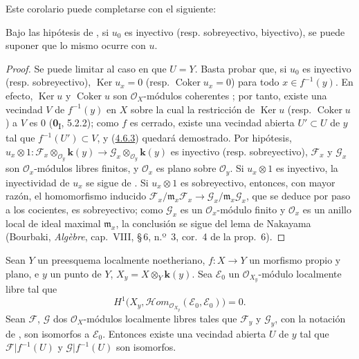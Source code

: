 Este corolario puede completarse con el siguiente:

\begin{corollary}[4.6.3]
\label{III.4.6.3}
\label{III.4.6.3-fr}
Bajo las hipótesis de , si $u_0$ es inyectivo \textup{(resp.} sobreyectivo, biyectivo), se puede suponer que lo mismo ocurre con $u$.
\end{corollary}

\begin{proof}
Se puede limitar al caso en que $U=Y$. Basta probar
que, si $u_0$ es
inyectivo (resp. sobreyectivo), $\operatorname{Ker}u_x=0$ (resp.
$\operatorname{Coker}u_x=0$) para todo $x\in f^{-1}(y)$. En efecto, $\operatorname{Ker}u$ y $\operatorname{Coker}u$ son
$\mathcal O_X$-módulos coherentes ; por tanto, existe una
vecindad $V$ de $f^{-1}(y)$ en $X$ sobre la cual la restricción de
$\operatorname{Ker}u$ (resp. $\operatorname{Coker}u$) a $V$ es $0$
(\textbf{0}\textsubscript{I}, 5.2.2); como $f$ es cerrado, existe una vecindad abierta
$U'\subset U$ de $y$ tal que $f^{-1}(U')\subset V$, y
(\hyperref[III.4.6.3-fr]{4.6.3}) quedará demostrado. Por hipótesis,
$u_x\otimes1:
\mathcal F_x\otimes_{\mathcal O_y}\boldsymbol{k}(y)
\longrightarrow
\mathcal G_x\otimes_{\mathcal O_y}\boldsymbol{k}(y)$
es inyectivo (resp. sobreyectivo),
$\mathcal F_x$ y $\mathcal G_x$
son $\mathcal O_x$-módulos libres finitos, y $\mathcal O_x$ es plano sobre
$\mathcal O_y$. Si $u_x\otimes1$ es inyectivo, la inyectividad de $u_x$
se sigue de . Si $u_x\otimes1$ es sobreyectivo,
entonces, con mayor razón, el homomorfismo inducido
$\mathcal F_x/\mathfrak m_x\mathcal F_x
\longrightarrow
\mathcal G_x/\mathfrak m_x\mathcal G_x$, que se deduce por paso a los cocientes, es sobreyectivo; como $\mathcal G_x$ es un $\mathcal O_x$-módulo finito y
$\mathcal O_x$ es un anillo local de ideal maximal $\mathfrak m_x$, la
conclusión se sigue del lema de Nakayama (Bourbaki,
\emph{Alg\`ebre}, cap.~VIII, \S\,6, n.º~3, cor.~4 de la prop.~6).
\end{proof}

\begin{corollary}[4.6.4]
\label{III.4.6.4}
\label{III.4.6.4-fr}
Sean $Y$ un preesquema localmente noetheriano, $f:X\to Y$ un
morfismo propio y plano, e $y$ un punto de $Y$, $X_y=X\otimes_Y\boldsymbol{k}(y)$. Sea $\mathcal E_0$ un
$\mathcal O_{X_y}$-módulo localmente libre tal que
\[
\label{III.4.6.4.1-fr}
H^1\bigl(X_y,
\mathcal{H}\!om_{\mathcal O_{X_y}}(\mathcal E_0,\mathcal E_0)\bigr)=0.
\tag{4.6.4.1}
\]
Sean $\mathcal F$, $\mathcal G$ dos $\mathcal O_X$-módulos localmente libres
tales que $\mathcal F_y$ y $\mathcal G_y$, con la notación de
, son isomorfos a $\mathcal E_0$. Entonces existe una
vecindad abierta $U$ de $y$ tal que $\mathcal F|f^{-1}(U)$ y
$\mathcal G|f^{-1}(U)$ son isomorfos.
\end{corollary}

